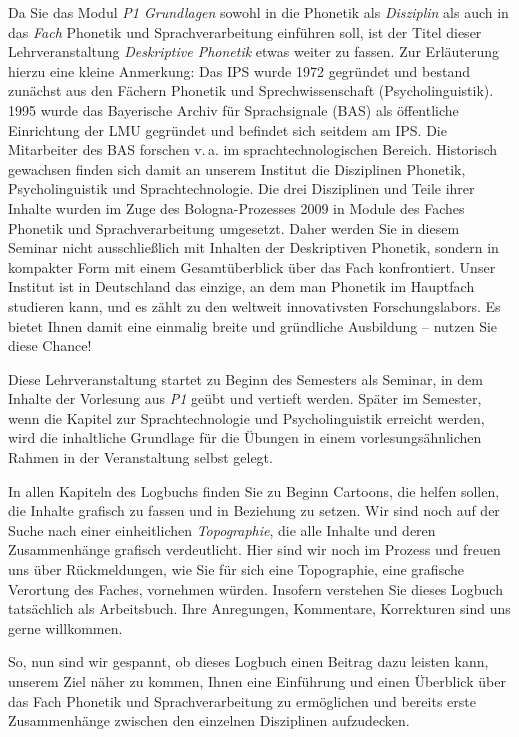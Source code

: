 \documentclass[11pt]{book}
\begin{document}
Da Sie das Modul \textit{P1 Grundlagen} sowohl in die Phonetik als \textit{Disziplin} als auch in das \textit{Fach} Phonetik und Sprachverarbeitung einführen soll, ist der Titel dieser Lehrveranstaltung \emph{Deskriptive Phonetik} etwas weiter zu fassen. Zur Erläuterung hierzu eine kleine Anmerkung: Das IPS wurde 1972 gegründet und bestand zunächst aus den Fächern Phonetik und Sprechwissenschaft (Psycholinguistik). 1995 wurde das Bayerische Archiv für Sprachsignale (BAS) als öffentliche Einrichtung der LMU gegründet und befindet sich seitdem am IPS. Die Mitarbeiter des BAS forschen v.\,a. im sprachtechnologischen Bereich. Historisch gewachsen finden sich damit an unserem Institut die Disziplinen Phonetik, Psycholinguistik und Sprachtechnologie.  Die drei Disziplinen und Teile ihrer Inhalte wurden im Zuge des Bologna-Prozesses 2009 in Module des Faches Phonetik und Sprachverarbeitung umgesetzt. Daher werden Sie in diesem Seminar nicht ausschließlich mit Inhalten der Deskriptiven Phonetik, sondern in kompakter Form mit einem Gesamtüberblick über das Fach konfrontiert. Unser Institut ist in Deutschland das einzige, an dem man Phonetik im Hauptfach studieren kann, und es zählt zu den weltweit innovativsten Forschungslabors. Es bietet Ihnen damit eine einmalig breite und gründliche Ausbildung – nutzen Sie diese Chance!

Diese Lehrveranstaltung startet zu Beginn des Semesters als Seminar, in dem Inhalte der Vorlesung aus \emph{P1} geübt und vertieft werden. Später im Semester, wenn die Kapitel zur Sprachtechnologie und Psycholinguistik erreicht werden, wird die inhaltliche Grundlage für die Übungen in einem vorlesungsähnlichen Rahmen in der Veranstaltung selbst gelegt.

In allen Kapiteln des Logbuchs finden Sie zu Beginn Cartoons, die helfen sollen, die Inhalte grafisch zu fassen und in Beziehung zu setzen. Wir sind noch auf der Suche nach einer einheitlichen \textit{Topographie}, die alle Inhalte und deren Zusammenhänge grafisch verdeutlicht. Hier sind wir noch im Prozess und freuen uns über Rückmeldungen, wie Sie für sich eine Topographie, eine grafische Verortung des Faches, vornehmen würden. Insofern verstehen Sie dieses Logbuch tatsächlich als Arbeitsbuch. Ihre Anregungen, Kommentare, Korrekturen sind uns gerne willkommen.

So, nun sind wir gespannt, ob dieses Logbuch einen Beitrag dazu leisten kann, unserem Ziel näher zu kommen, Ihnen eine Einführung und einen Überblick über das Fach Phonetik und Sprachverarbeitung zu ermöglichen und bereits erste Zusammenhänge zwischen den einzelnen Disziplinen aufzudecken.
\end{document}
